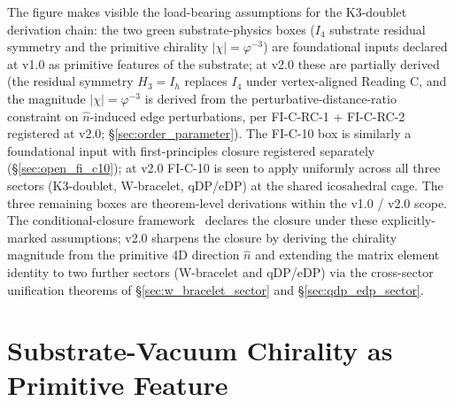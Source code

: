 \documentclass[11pt,letterpaper]{article}
\newcommand{\phig}{\varphi}
\newcommand{\Ifour}{I_4}
\begin{document}
The figure makes visible the load-bearing assumptions for the K3-doublet derivation chain: the two green substrate-physics boxes ($\Ifour$ substrate residual symmetry and the primitive chirality $|\chi| = \phig^{-3}$) are foundational inputs declared at v1.0 as primitive features of the substrate; at v2.0 these are partially derived (the residual symmetry $H_3 = I_h$ replaces $\Ifour$ under vertex-aligned Reading C, and the magnitude $|\chi| = \phig^{-3}$ is derived from the perturbative-distance-ratio constraint on $\hat{n}$-induced edge perturbations, per FI-C-RC-1 + FI-C-RC-2 registered at v2.0; \S\ref{sec:order_parameter}). The FI-C-10 box is similarly a foundational input with first-principles closure registered separately (\S\ref{sec:open_fi_c10}); at v2.0 FI-C-10 is seen to apply uniformly across all three sectors (K3-doublet, W-bracelet, qDP/eDP) at the shared icosahedral cage. The three remaining boxes are theorem-level derivations within the v1.0 / v2.0 scope. The conditional-closure framework~\cite{abshier_conditional_closure} declares the closure under these explicitly-marked assumptions; v2.0 sharpens the closure by deriving the chirality magnitude from the primitive 4D direction $\hat{n}$ and extending the matrix element identity to two further sectors (W-bracelet and qDP/eDP) via the cross-sector unification theorems of \S\ref{sec:w_bracelet_sector} and \S\ref{sec:qdp_edp_sector}.

\section{Substrate-Vacuum Chirality as Primitive Feature}\label{sec:substrate_vacuum}
\end{document}

